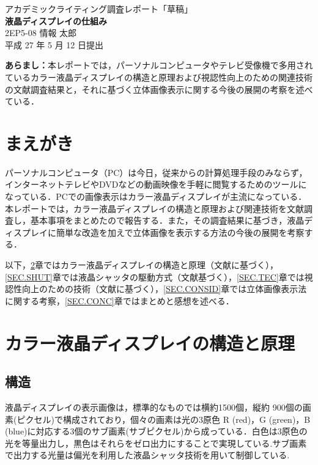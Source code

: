 \documentclass[dvipdfmx,uplatex]{jsarticle}
\begin{document}
\begin{center}
	アカデミックライティング調査レポート「草稿」\\
	\vspace{5mm}
	{\Large \textbf{液晶ディスプレイの仕組み}}\\
	\vspace{5mm}		
	2EP5-08 情報 太郎\\
	平成 27 年 5 月 12 日提出
\end{center}

\noindent
\textbf{あらまし：}本レポートでは，パーソナルコンピュータやテレビ受像機で多用されているカラー液晶ディスプレイの構造と原理および視認性向上のための関連技術の文献調査結果と，それに基づく立体画像表示に関する今後の展開の考察を述べている．



\section{まえがき}
パーソナルコンピュータ（PC）は今日，従来からの計算処理手段のみならず，インターネットテレビやDVDなどの動画映像を手軽に閲覧するためのツールになっている．PCでの画像表示はカラー液晶ディスプレイが主流になっている．本レポートでは，カラー液晶ディスプレイの構造と原理および関連技術を文献調査し，基本事項をまとめたので報告する．また，その調査結果に基づき，液晶ディスプレイに簡単な改造を加えで立体画像を表示する方法の今後の展開を考察する．

以下，\ref{SEC.MECH}章ではカラー液晶ディスプレイの構造と原理（文献\cite{NAEMURA}に基づく），\ref{SEC.SHUT}章では液晶シャッタの駆動方式（文献\cite{SATO}基づく），\ref{SEC.TEC}章では視認性向上のための技術（文献\cite{HATTORI}に基づく），\ref{SEC.CONSID}章では立体画像表示法に関する考察，\ref{SEC.CONC}章ではまとめと感想を述べる．

\section{カラー液晶ディスプレイの構造と原理}\label{SEC.MECH}
\subsection{構造}
液晶ディスプレイの表示画像は，標準的なものでは横約1500個，縦約 900個の画素(ピクセル)で構成されており，個々の画素は光の3原色 R (red)，G (green)，B (blue)に対応する3個のサブ画素(サブピクセル)から成っている．白色は3原色の光を等量出力し，黒色はそれらをゼロ出力にすることで実現している.サブ画素で出力する光量は偏光を利用した液晶シャッタ技術を用いて制御している.
\end{document}
